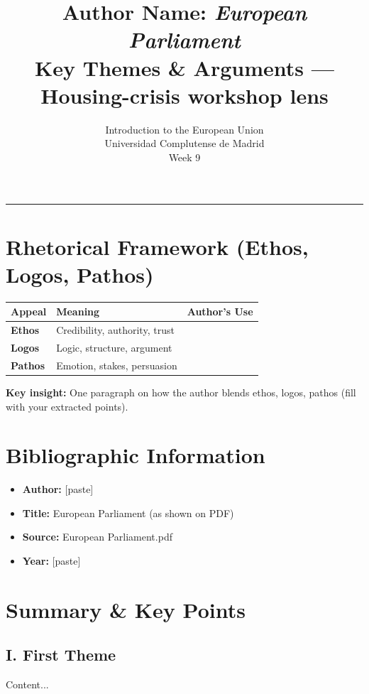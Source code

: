 \documentclass[11pt,a4paper]{article}
\begin{document}
\title{Author Name: \textit{European Parliament}\\Key Themes \& Arguments --- Housing-crisis workshop lens}
\author{Introduction to the European Union\\Universidad Complutense de Madrid\\Week 9}
\date{}
\maketitle
\vspace{-1em}
\hrule
\vspace{1em}

\section*{Rhetorical Framework (Ethos, Logos, Pathos)}
\begin{table}[h]
\centering
\begin{tabular}{@{}lll@{}}
\toprule
\textbf{Appeal} & \textbf{Meaning} & \textbf{Author's Use} \\
\midrule
\textbf{Ethos} & Credibility, authority, trust & \\
\textbf{Logos} & Logic, structure, argument & \\
\textbf{Pathos} & Emotion, stakes, persuasion & \\
\bottomrule
\end{tabular}
\end{table}

\textbf{Key insight:} One paragraph on how the author blends ethos, logos, pathos (fill with your extracted points).

\section*{Bibliographic Information}
\begin{itemize}
\item \textbf{Author:} [paste]
\item \textbf{Title:} European Parliament (as shown on PDF)
\item \textbf{Source:} European Parliament.pdf
\item \textbf{Year:} [paste]
\end{itemize}

\section*{Summary & Key Points}
\subsection*{I. First Theme}
Content...
\end{document}
